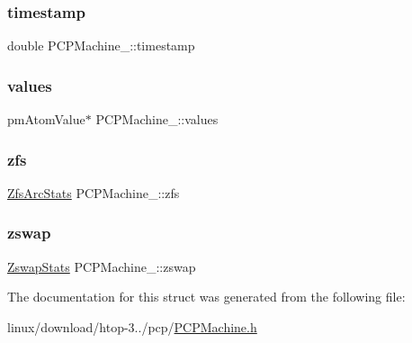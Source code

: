 \mbox{\label{structPCPMachine___a09dcfe204a695b0a70a95b40c2089668}} 
\subsubsection{\texorpdfstring{timestamp}{timestamp}}
{\footnotesize\ttfamily double P\+C\+P\+Machine\+\_\+\+::timestamp}

\mbox{\label{structPCPMachine___a8cc5c4d342580a24541ce80b8a7200b9}} 
\subsubsection{\texorpdfstring{values}{values}}
{\footnotesize\ttfamily pm\+Atom\+Value$\ast$ P\+C\+P\+Machine\+\_\+\+::values}

\mbox{\label{structPCPMachine___abfed51aa24b77dc539d9bf210c139702}} 
\subsubsection{\texorpdfstring{zfs}{zfs}}
{\footnotesize\ttfamily \hyperlink{ZfsArcStats_8h_a2adeccbbba50329f61d34f355e5faddc}{Zfs\+Arc\+Stats} P\+C\+P\+Machine\+\_\+\+::zfs}

\mbox{\label{structPCPMachine___a8c5b561725c830dfdd2803c1b77de396}} 
\subsubsection{\texorpdfstring{zswap}{zswap}}
{\footnotesize\ttfamily \hyperlink{ZswapStats_8h_ad2bd350512b2d43b858fc4632f2c4b26}{Zswap\+Stats} P\+C\+P\+Machine\+\_\+\+::zswap}



The documentation for this struct was generated from the following file\+:\begin{DoxyCompactItemize}
\item 
linux/download/htop-\/3../pcp/\hyperlink{PCPMachine_8h}{P\+C\+P\+Machine.\+h}\end{DoxyCompactItemize}
